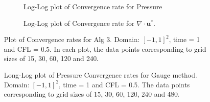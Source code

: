 \begin{figure}[H]
	\centering
	\begin{subfigure}[t]{4.5in}
		\centering
		\caption{Log-Log plot of Convergence rate for Pressure}\label{fig:6.4a}		
	\end{subfigure}
	\quad
	\begin{subfigure}[t]{4.5in}
		\centering
		\caption{Log-Log plot of Convergence rate for $\nabla \cdot \textbf{u}^*$. }\label{fig:6.4b}
	\end{subfigure}
	\caption{Plot of Convergence rates for Alg 3. Domain: $[-1,1]^2$, time = 1 and CFL = 0.5. In each plot, the data points corresponding to grid sizes of 15, 30, 60, 120 and 240.}\label{fig:6.4}
\end{figure}

\begin{figure}[H]
	\centering
	\caption{Long-Log plot of Pressure Convergence rates for Gauge method. Domain: $[-1,1]^2$, time = 1 and CFL = 0.5. The data points corresponding to grid sizes of 15, 30, 60, 120, 240 and 480.}\label{fig:6.5}
\end{figure}

